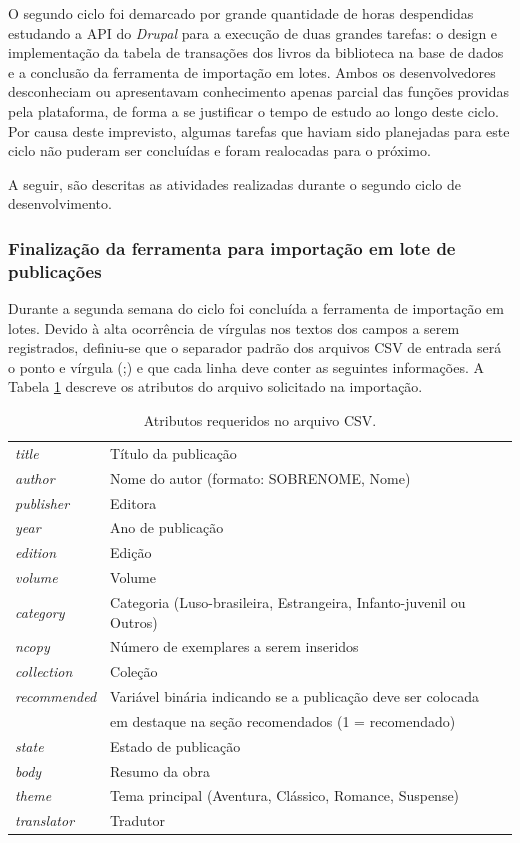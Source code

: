 \documentclass[a4paper]{article}
\begin{document}
O segundo ciclo foi demarcado por grande quantidade de horas despendidas estudando a API do \textit{Drupal} para a execução de duas grandes tarefas: o design e implementação da tabela de transações dos livros da biblioteca na base de dados e a conclusão da ferramenta de importação em lotes. Ambos os desenvolvedores desconheciam ou apresentavam conhecimento apenas parcial das funções providas pela plataforma, de forma a se justificar o tempo de estudo ao longo deste ciclo. Por causa deste imprevisto, algumas tarefas que haviam sido planejadas para este ciclo não puderam ser concluídas e foram realocadas para o próximo.

A seguir, são descritas as atividades realizadas durante o segundo ciclo de desenvolvimento.


\subsubsection{Finalização da ferramenta para importação em lote de publicações}

Durante a segunda semana do ciclo foi concluída a ferramenta de importação em lotes. Devido à alta ocorrência de vírgulas nos textos dos campos a serem registrados, definiu-se que o separador padrão dos arquivos CSV de entrada será o ponto e vírgula (;) e que cada linha deve conter as seguintes informações. A Tabela \ref{csv} descreve os atributos do arquivo solicitado na importação.

\begin{table}[hc]
\centering
\caption{Atributos requeridos no arquivo CSV.\label{csv}}
\begin{tabular}{ll}
\hline
\textit{title} & Título da publicação \\
\textit{author} & Nome do autor (formato: SOBRENOME, Nome) \\
\textit{publisher} & Editora \\
\textit{year} & Ano de publicação \\
\textit{edition} & Edição \\
\textit{volume} & Volume \\
\textit{category} & Categoria (Luso-brasileira, Estrangeira, Infanto-juvenil ou Outros) \\
\textit{ncopy} & Número de exemplares a serem inseridos \\
\textit{collection} & Coleção \\
\textit{recommended} & Variável binária indicando se a publicação deve ser colocada \\
 & em destaque na seção recomendados (1 = recomendado) \\
\textit{state} & Estado de publicação \\
\textit{body} & Resumo da obra \\
\textit{theme} & Tema principal (Aventura, Clássico, Romance, Suspense) \\
\textit{translator} & Tradutor \\
\hline
\end{tabular}
\end{table}
\end{document}
